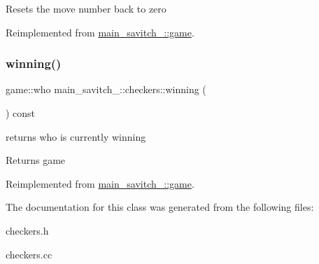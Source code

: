 Resets the move number back to zero 

Reimplemented from \hyperlink{classmain__savitch__14_1_1game_ad521a7d78e7c163a0bc28b709f0d45fd}{main\+\_\+savitch\+\_\+::game}.

\mbox{\label{classmain__savitch__14_1_1checkers_aad9a08662e9fdf62752c60997b29370e}} 
\subsubsection{\texorpdfstring{winning()}{winning()}}
{\footnotesize\ttfamily game\+::who main\+\_\+savitch\+\_\+::checkers\+::winning (\begin{DoxyParamCaption}{ }\end{DoxyParamCaption}) const\hspace{0.3cm}{\ttfamily [virtual]}}

returns who is currently winning \begin{DoxyReturn}{Returns}
game 
\end{DoxyReturn}


Reimplemented from \hyperlink{classmain__savitch__14_1_1game_a2f0d5338c12bd98d52fe2383ece5c45e}{main\+\_\+savitch\+\_\+::game}.



The documentation for this class was generated from the following files\+:\begin{DoxyCompactItemize}
\item 
checkers.\+h\item 
checkers.\+cc\end{DoxyCompactItemize}
